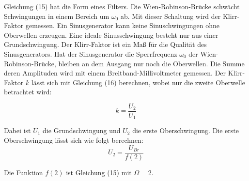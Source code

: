 Gleichung (15) hat die Form eines Filters. Die Wien-Robinson-Brücke schwächt Schwingungen in einem
Bereich um $\omega_0$ ab. Mit dieser Schaltung wird der Klirr-Faktor gemessen. Ein Sinusgenerator kann keine
Sinuschwingungen ohne Oberwellen erzeugen. Eine ideale Sinusschwingung besteht nur aus einer Grundschwingung.
Der Klirr-Faktor ist ein Maß für die Qualität des Sinusgenerators. Hat der Sinusgenerator die Sperrfrequenz $\omega_0$
der Wien-Robinson-Brücke, bleiben an dem Ausgang nur noch die Oberwellen. Die Summe deren Amplituden wird mit einem
Breitband-Millivoltmeter gemessen. Der Klirr-Faktor $k$ lässt sich mit Gleichung (16) berechnen, wobei nur die zweite
Oberwelle betrachtet wird:

\begin{equation}
  k = \frac{{U_2}}{U_1}
\end{equation}

Dabei ist $U_1$ die Grundschwingung und $U_2$ die erste Oberschwingung. Die erste Oberschwingung lässt sich wie folgt
berechnen:
\begin{equation}
  U_2 = \frac{U_{Br}}{f(2)}
\end{equation}


Die Funktion $f(2)$ ist Gleichung (15) mit $\Omega = 2$.
